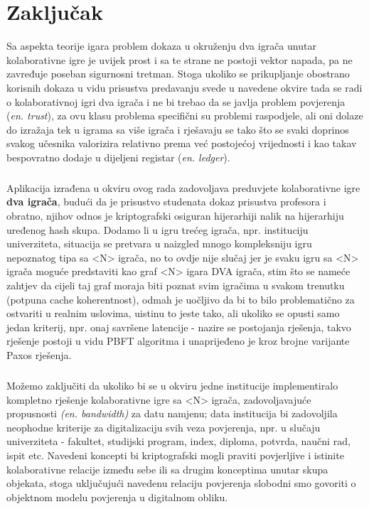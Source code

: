 \chapter{Zaključak}
Sa aspekta teorije igara\cite{davis2012game} problem dokaza u okruženju dva igrača unutar kolaborativne igre\cite{nash1953two} je uvijek prost i sa te strane ne postoji vektor napada, pa ne zavređuje poseban sigurnosni tretman. Stoga ukoliko se prikupljanje obostrano korisnih dokaza u vidu prisustva predavanju svede u navedene okvire tada se radi o kolaborativnoj igri dva igrača i ne bi trebao da se javlja problem povjerenja (\textit{en. trust}), za ovu klasu problema specifični su problemi raspodjele, ali oni dolaze do izražaja tek u igrama sa više igrača i rješavaju se tako što se svaki doprinos svakog učesnika valorizira relativno prema već postojećoj vrijednosti i kao takav bespovratno dodaje u dijeljeni registar (\textit{en. ledger})\cite{antonopoulos2014mastering}.

\paragraph*{}
Aplikacija izrađena u okviru ovog rada zadovoljava preduvjete kolaborativne igre \textbf{dva igrača}, budući da je prisustvo studenata dokaz prisustva profesora i obratno, njihov odnos je kriptografski osiguran hijerarhiji nalik na hijerarhiju uređenog hash skupa. Dodamo li u igru trećeg igrača, npr. instituciju univerziteta, situacija se pretvara u naizgled mnogo kompleksniju igru nepoznatog tipa sa <N> igrača, no to ovdje nije slučaj jer je svaku igru sa <N> igrača moguće predstaviti kao graf <N> igara DVA igrača, stim što se nameće zahtjev da cijeli taj graf moraja biti poznat svim igračima u svakom trenutku (potpuna cache koherentnost), odmah je uočljivo da bi to bilo problematično za ostvariti u realnim uslovima, uistinu to jeste tako, ali ukoliko se opusti samo jedan kriterij, npr. onaj savršene latencije - nazire se postojanja rješenja, takvo rješenje postoji u vidu PBFT algoritma\cite{lamport1982byzantine} i unaprijeđeno je kroz brojne varijante Paxos rješenja\cite{lamport2001paxos}.

\paragraph*{}
Možemo zaključiti da ukoliko bi se u okviru jedne institucije implementiralo kompletno rješenje kolaborativne igre sa <N> igrača, zadovoljavajuće propusnosti \textit{(en. bandwidth)} za datu namjenu; data institucija bi zadovoljila neophodne kriterije za digitalizaciju svih veza povjerenja, npr. u slučaju univerziteta - fakultet, studijski program, index, diploma, potvrda, naučni rad, ispit etc. Navedeni koncepti bi kriptografski mogli praviti povjerljive i istinite kolaborativne relacije između sebe ili sa drugim konceptima unutar skupa objekata, stoga uključujući navedenu relaciju povjerenja slobodni smo govoriti o objektnom modelu povjerenja u digitalnom obliku.

